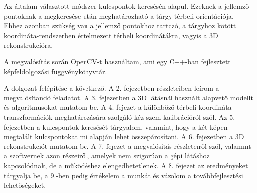 Az általam választott módszer kulcspontok keresésén alapul. Ezeknek a jellemző pontoknak a megkeresése után meghatározható a tárgy térbeli orientációja. Ehhez azonban szükség van a jellemző pontokhoz tartozó, a tárgyhoz kötött koordináta-rendszerben értelmezett térbeli koordinátákra, vagyis a 3D rekonstrukcióra.

A megvalósítás során OpenCV-t használtam, ami egy C++-ban fejlesztett képfeldolgozási függvénykönyvtár.

A dolgozat felépítése a következő. A 2. fejezetben részleteiben leírom a megvalósítandó feladatot. A 3. fejezetben a 3D látásnál használt alapvető modellt és algoritmusokat mutatom be. A 4. fejezet a különböző térbeli koordináta-transzformációk meghatározására szolgáló kéz-szem kalibrációról szól. Az 5. fejezetben a kulcspontok keresését tárgyalom, valamint, hogy a két képen megtalált kulcspontokat mi alapján lehet összepárosítani. A 6. fejezetben a 3D rekonstrukciót mutatom be. A 7. fejezet a megvalósítás részleteiről szól, valamint a szoftvernek azon részeiről, amelyek nem szigorúan a gépi látáshoz kapcsolódnak, de a működéshez elengedhetetlenek. A 8. fejezet az eredményeket tárgyalja be, a 9.-ben pedig értékelem a munkát és vázolom a továbbfejlesztési lehetőségeket.